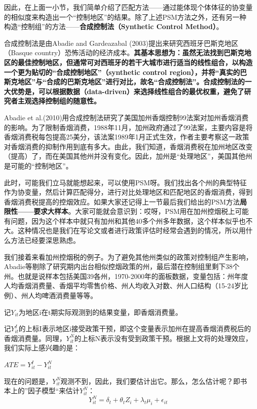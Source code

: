 \documentclass[cn,10pt,math=newtx,citestyle=gb7714-2015,bibstyle=gb7714-2015]{elegantbook}
\begin{document}
	因此，在上面一小节，我们简单介绍了匹配方法——通过能体现个体体征的协变量的相似度来构造出一个“控制地区”的结果。除了上述PSM方法之外，还有另一种构造“控制组”的方法——\textbf{合成控制法（Synthetic Control Method）}。
	
	合成控制法是由Abadie and Gardeazabal (2003)提出来研究西班牙巴斯克地区（Basque country）恐怖活动的经济成本。\textbf{其基本思想为：虽然无法找到巴斯克地区的最佳控制地区，但通常可对西班牙的若干大城市进行适当的线性组合，以构造一个更为贴切的“合成控制地区”（synthetic control region），并将“真实的巴斯克地区”与“合成的巴斯克地区”进行对比，故名“合成控制法”。合成控制法的一大优势是，可以根据数据（data-driven）来选择线性组合的最优权重，避免了研究者主观选择控制组的随意性。}
	
	Abadie et al.(2010)用合成控制法研究了美国加州香烟控制99法案对加州香烟消费的影响。为了限制香烟消费，1988年11月，加州政府通过了99法案，主要内容是将香烟消费税每包提高25美分，该法案1989年1月正式生效，作者主要考察这一政策对香烟消费的抑制作用到底有多大。由此，我们知道，香烟消费税在加州地区改变（提高）了，而在美国其他州并没有变化。因此，加州是“处理地区”，美国其他州是可能的“控制地区”。
	
	此时，可能我们立马就能想起来，可以使用PSM呀。我们找出各个州的典型特征作为协变量，然后计算匹配得分，进行对比处理地区和匹配地区的香烟消费，得到香烟消费税提高的控烟效应。如果大家还记得上一节最后我们给出的PSM方法\textbf{局限性——要求大样本}。大家可能就会意识到：哎呀，PSM用在加州控烟税上可能有问题，因为这个样本中就只有加州和其他40多个州多年数据，这个样本似乎也不大。这种情况也是我们在写论文或者进行政策评估时经常会遇到的情况，所以用什么方法已经要深思熟虑。
	
	我们接着来看加州控烟税的例子。为了避免其他州类似的政策对控制组产生影响，Abadie等剔除了研究期内出台相似控烟政策的州，最后潜在控制组里剩下38个州。也就是说样本包括美国39各州，1970-2000年的面板数据，变量包括：州年度人均香烟消费量、香烟平均零售价格、州人均收入对数、州人口结构（15-24岁比例）、州人均啤酒消费量等等。
	
	记$Y_{it}$为地区i在t期实际观测到的结果变量，即香烟消费量。
	
	记$Y_{it}^I$的上标I表示地区i接受政策干预，即这个变量表示加州在提高香烟消费税后的香烟消费量。同理，$Y_{it}^N$的上标N表示没有受到政策干预。根据上文将的处理效应，我们实际上感兴趣的是：
	\begin{center}
		$ATE=Y_{it}^I-Y_{it}^N$
	\end{center}
	
	现在的问题是，$Y_{it}^N$观测不到，因此，我们要估计出它。那么，怎么估计呢？即书本上的”因子模型“来估计$Y_{it}^N$：
	\begin{equation}
		Y_{it}^N=\delta_t+\theta_tZ_i+\lambda_t\mu_i+\epsilon_{it}
	\end{equation}
	
\end{document}
